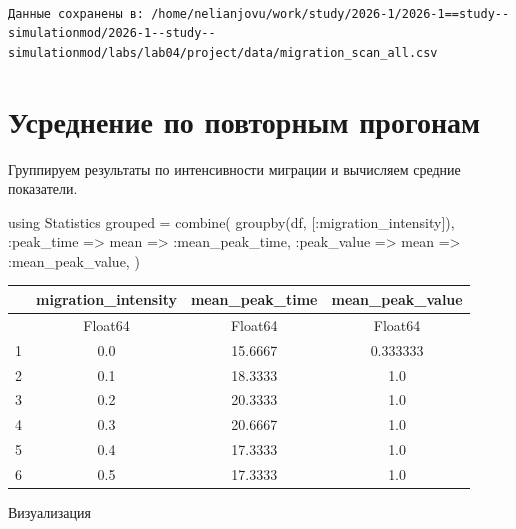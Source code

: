 \documentclass[
  12pt,
  a4paper,
  DIV=11,
  numbers=noendperiod]{scrreprt}
\newenvironment{Shaded}{\begin{snugshade}}{\end{snugshade}}
\newcommand{\BuiltInTok}[1]{\textcolor[rgb]{0.00,0.23,0.31}{#1}}
\newcommand{\FunctionTok}[1]{\textcolor[rgb]{0.28,0.35,0.67}{#1}}
\newcommand{\ImportTok}[1]{\textcolor[rgb]{0.00,0.46,0.62}{#1}}
\newcommand{\NormalTok}[1]{\textcolor[rgb]{0.00,0.23,0.31}{#1}}
\newcommand{\OperatorTok}[1]{\textcolor[rgb]{0.37,0.37,0.37}{#1}}
\begin{document}
\begin{verbatim}

Данные сохранены в: /home/nelianjovu/work/study/2026-1/2026-1==study--simulationmod/2026-1--study--simulationmod/labs/lab04/project/data/migration_scan_all.csv
\end{verbatim}

\section{Усреднение по повторным
прогонам}\label{ux443ux441ux440ux435ux434ux43dux435ux43dux438ux435-ux43fux43e-ux43fux43eux432ux442ux43eux440ux43dux44bux43c-ux43fux440ux43eux433ux43eux43dux430ux43c-2}

Группируем результаты по интенсивности миграции и вычисляем средние
показатели.

\begin{Shaded}
\begin{Highlighting}[]
\ImportTok{using} \BuiltInTok{Statistics}
\NormalTok{grouped }\OperatorTok{=} \FunctionTok{combine}\NormalTok{(}
    \FunctionTok{groupby}\NormalTok{(df, [}\OperatorTok{:}\NormalTok{migration\_intensity]),}
    \OperatorTok{:}\NormalTok{peak\_time }\OperatorTok{=\textgreater{}}\NormalTok{ mean }\OperatorTok{=\textgreater{}} \OperatorTok{:}\NormalTok{mean\_peak\_time,}
    \OperatorTok{:}\NormalTok{peak\_value }\OperatorTok{=\textgreater{}}\NormalTok{ mean }\OperatorTok{=\textgreater{}} \OperatorTok{:}\NormalTok{mean\_peak\_value,}
\NormalTok{)}
\end{Highlighting}
\end{Shaded}

\begin{tabular}{r|ccc}
    & migration\_intensity & mean\_peak\_time & mean\_peak\_value\\
    \hline
    & Float64 & Float64 & Float64\\
    \hline
    1 & 0.0 & 15.6667 & 0.333333 \\
    2 & 0.1 & 18.3333 & 1.0 \\
    3 & 0.2 & 20.3333 & 1.0 \\
    4 & 0.3 & 20.6667 & 1.0 \\
    5 & 0.4 & 17.3333 & 1.0 \\
    6 & 0.5 & 17.3333 & 1.0 \\
\end{tabular}

Визуализация
\end{document}
